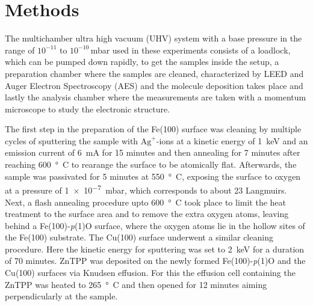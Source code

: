 \chapter{Methods}

The multichamber ultra high vacuum (UHV) system with a base pressure in the range of $10^{-11}$ to $10^{-10}\,$mbar used in these experiments consists of a loadlock, which can be pumped down rapidly, to get the samples inside the setup, a preparation chamber where the samples are cleaned, characterized by LEED and Auger Electron Spectroscopy (AES) and the molecule deposition takes place and lastly the analysis chamber where the measurements are taken with a momentum microscope to study the electronic structure.

The first step in the preparation of the Fe(100) surface was cleaning by multiple cycles of sputtering the sample with $\mathrm{Ag}^+$-ions at a kinetic energy of \qty{1}{keV} and an emission current of \qty{6}{mA} for 15 minutes and then annealing for 7 minutes after reaching \qty{600}{°C} to rearange the surface to be atomically flat.
Afterwards, the sample was passivated for 5 minutes at \qty{550}{°C}, exposing the surface to oxygen at a pressure of \qty{1e-7}{mbar}, which corresponds to about 23 Langmuirs.
Next, a flash annealing procedure upto \qty{600}{°C} took place to limit the heat treatment to the surface area and to remove the extra oxygen atoms, leaving behind a Fe(100)-\textit{p}(1)O surface, where the oxygen atoms lie in the hollow sites of the Fe(100) substrate.
The Cu(100) surface underwent a similar cleaning procedure.
Here the kinetic energy for sputtering was set to \qty{2}{keV} for a duration of 70 minutes.
ZnTPP was deposited on the newly formed Fe(100)-\textit{p}(1)O and the Cu(100) surfaces via Knudsen effusion.
For this the effusion cell containing the ZnTPP was heated to \qty{265}{°C} and then opened for 12 minutes aiming perpendicularly at the sample.

